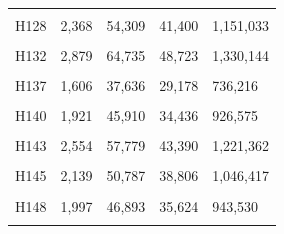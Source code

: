 \documentclass[
  a4paper,
  titlepage]{article}
\begin{document}
\begin{longtable}[t]{lllll}
\cellcolor{gray!6}{H127} & \cellcolor{gray!6}{2,383} & \cellcolor{gray!6}{54,276} & \cellcolor{gray!6}{41,144} & \cellcolor{gray!6}{1,095,709}\\
 
H128 & 2,368 & 54,309 & 41,400 & 1,151,033\\
 
\cellcolor{gray!6}{H129} & \cellcolor{gray!6}{1,830} & \cellcolor{gray!6}{41,357} & \cellcolor{gray!6}{31,090} & \cellcolor{gray!6}{888,995}\\
 
H132 & 2,879 & 64,735 & 48,723 & 1,330,144\\
 
\cellcolor{gray!6}{H135} & \cellcolor{gray!6}{1,993} & \cellcolor{gray!6}{46,504} & \cellcolor{gray!6}{34,991} & \cellcolor{gray!6}{967,717}\\
 
H137 & 1,606 & 37,636 & 29,178 & 736,216\\
 
\cellcolor{gray!6}{H138} & \cellcolor{gray!6}{2,126} & \cellcolor{gray!6}{48,869} & \cellcolor{gray!6}{37,348} & \cellcolor{gray!6}{1,088,113}\\
 
H140 & 1,921 & 45,910 & 34,436 & 926,575\\
 
\cellcolor{gray!6}{H142} & \cellcolor{gray!6}{1,905} & \cellcolor{gray!6}{45,289} & \cellcolor{gray!6}{33,815} & \cellcolor{gray!6}{871,692}\\
 
H143 & 2,554 & 57,779 & 43,390 & 1,221,362\\
 
\cellcolor{gray!6}{H144} & \cellcolor{gray!6}{2,506} & \cellcolor{gray!6}{56,867} & \cellcolor{gray!6}{42,757} & \cellcolor{gray!6}{1,205,864}\\
 
H145 & 2,139 & 50,787 & 38,806 & 1,046,417\\
 
\cellcolor{gray!6}{H146} & \cellcolor{gray!6}{2,153} & \cellcolor{gray!6}{49,304} & \cellcolor{gray!6}{36,787} & \cellcolor{gray!6}{1,003,049}\\
 
H148 & 1,997 & 46,893 & 35,624 & 943,530\\
 
\cellcolor{gray!6}{H149} & \cellcolor{gray!6}{1,871} & \cellcolor{gray!6}{45,354} & \cellcolor{gray!6}{34,291} & \cellcolor{gray!6}{934,152}\\
 

\end{longtable}
\end{document}
